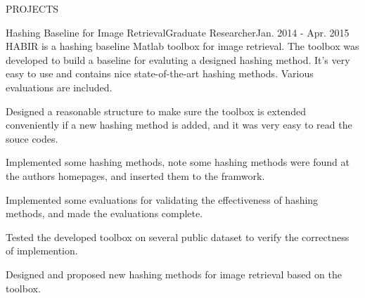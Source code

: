 \documentclass{resume} %
\begin{document}
\begin{rSection}{PROJECTS}

\begin{pSubsection}{Hashing Baseline for Image Retrieval}{Graduate Researcher}{Jan. 2014 - Apr. 2015}
{HABIR is a hashing baseline Matlab toolbox for image retrieval. The toolbox was developed to build a baseline for evaluting a designed hashing method. It's very easy to use and contains nice state-of-the-art hashing methods. Various evaluations are included.
}
\item Designed a reasonable structure to make sure the toolbox is extended conveniently if a new hashing method is added, and it was very easy to read the souce codes.
\item Implemented some hashing methods, note some hashing methods were found at the authors homepages, and inserted them to the framwork.
\item Implemented some evaluations for validating the effectiveness of hashing methods, and made the evaluations complete.
\item Tested the developed toolbox on several public dataset to verify the correctness of implemention.
\item Designed and proposed new hashing methods for image retrieval based on the toolbox.
\end{pSubsection}
\end{rSection}


\end{document}
